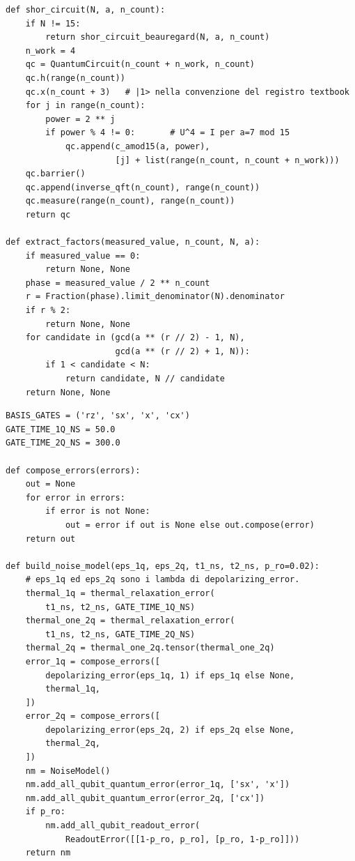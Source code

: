 \begin{lstlisting}[caption={Circuito N15 e post-processing classico}, label={lst:circuito_completo_di_shor}]
def shor_circuit(N, a, n_count):
    if N != 15:
        return shor_circuit_beauregard(N, a, n_count)
    n_work = 4
    qc = QuantumCircuit(n_count + n_work, n_count)
    qc.h(range(n_count))
    qc.x(n_count + 3)   # |1> nella convenzione del registro textbook
    for j in range(n_count):
        power = 2 ** j
        if power % 4 != 0:       # U^4 = I per a=7 mod 15
            qc.append(c_amod15(a, power),
                      [j] + list(range(n_count, n_count + n_work)))
    qc.barrier()
    qc.append(inverse_qft(n_count), range(n_count))
    qc.measure(range(n_count), range(n_count))
    return qc

def extract_factors(measured_value, n_count, N, a):
    if measured_value == 0:
        return None, None
    phase = measured_value / 2 ** n_count
    r = Fraction(phase).limit_denominator(N).denominator
    if r % 2:
        return None, None
    for candidate in (gcd(a ** (r // 2) - 1, N),
                      gcd(a ** (r // 2) + 1, N)):
        if 1 < candidate < N:
            return candidate, N // candidate
    return None, None
\end{lstlisting}

\begin{lstlisting}[caption={Noise model uniforme illustrativo: RZ virtuale, durate 1Q/2Q separate}, label={lst:costruzione_del_noise_model}]
BASIS_GATES = ('rz', 'sx', 'x', 'cx')
GATE_TIME_1Q_NS = 50.0
GATE_TIME_2Q_NS = 300.0

def compose_errors(errors):
    out = None
    for error in errors:
        if error is not None:
            out = error if out is None else out.compose(error)
    return out

def build_noise_model(eps_1q, eps_2q, t1_ns, t2_ns, p_ro=0.02):
    # eps_1q ed eps_2q sono i lambda di depolarizing_error.
    thermal_1q = thermal_relaxation_error(
        t1_ns, t2_ns, GATE_TIME_1Q_NS)
    thermal_one_2q = thermal_relaxation_error(
        t1_ns, t2_ns, GATE_TIME_2Q_NS)
    thermal_2q = thermal_one_2q.tensor(thermal_one_2q)
    error_1q = compose_errors([
        depolarizing_error(eps_1q, 1) if eps_1q else None,
        thermal_1q,
    ])
    error_2q = compose_errors([
        depolarizing_error(eps_2q, 2) if eps_2q else None,
        thermal_2q,
    ])
    nm = NoiseModel()
    nm.add_all_qubit_quantum_error(error_1q, ['sx', 'x'])
    nm.add_all_qubit_quantum_error(error_2q, ['cx'])
    if p_ro:
        nm.add_all_qubit_readout_error(
            ReadoutError([[1-p_ro, p_ro], [p_ro, 1-p_ro]]))
    return nm
\end{lstlisting}


